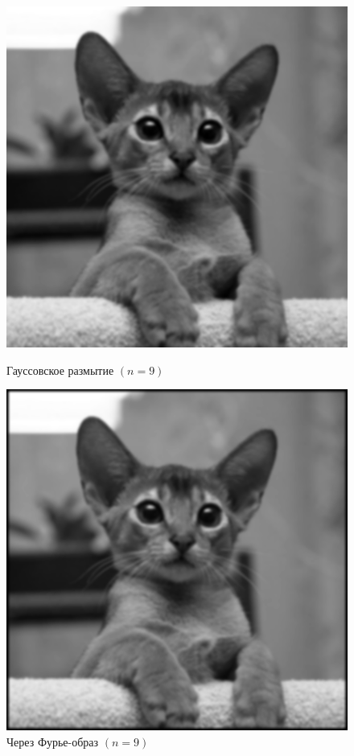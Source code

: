 \documentclass[a4paper]{article}
\begin{document}
\begin{figure}[H]
    \hspace{5em}
    \begin{minipage}{0.35\textwidth}
        \includegraphics[width=\textwidth]{sources/2second/gauss_9.png}
        \caption{Гауссовское размытие $(n = 9)$}
    \end{minipage}\hfill
    \begin{minipage}{0.35\textwidth}
        \includegraphics[width=\textwidth]{sources/2second/gauss_fft_9.png}
        \caption{Через Фурье-образ $(n = 9)$}
    \end{minipage}
    \hspace{5em}
\end{figure}
\end{document}
